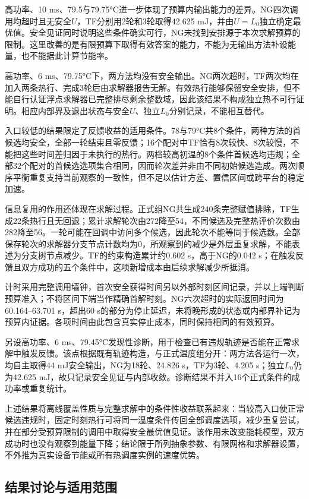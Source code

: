 高功率、10 ms、79.5与79.75°C进一步体现了预算内输出能力的差异。NG四次调用均超时且无安全$U$，TF分别用2轮和3轮取得42.625 mJ，并由$U=L_0$独立确定最优值。安全见证同时说明这些条件确实可行，NG未找到安排源于本次求解预算的限制。这里改善的是有限预算下取得有效答案的能力，不能为无输出方法补设能量，也不能据此计算节能率。

高功率、6 ms、79.75°C下，两方法均没有安全输出。NG两次超时，TF两次均在加入两条热行、完成3轮后由求解器报告无解。有效热行能够保留安全安排，但不能自行认证浮点求解器已完整排尽剩余整数域，因此该结果不构成独立热不可行证明。相应内部界及退出状态与安全$U$、独立$L_0$分别记录，不能相互替代。

入口较低的结果限定了反馈收益的适用条件。78与79°C共8个条件，两种方法的首候选均安全，全部一轮结束且零反馈；16个配对中TF恰有8次较快、8次较慢，不能把这些时间差归因于未执行的热行。两档较高初温的8个条件首候选均违规；全部32个配对的首候选选项集合相同，因而轮次差并非由不同初始候选造成。两次顺序平衡重复支持当前观察的一致性，但不足以估计方差、置信区间或跨平台的稳定加速。

信息复用的作用还体现在求解过程。正式组NG共生成240条完整赋值排除，TF生成22条热行且无回退；累计求解轮次由272降至54，不同候选及完整热评价次数由282降至56。一轮可能在回调中访问多个候选，因此轮次不能等同于候选数。全部保存轮次的求解器分支节点计数均为0，所观察到的减少是外层重复求解，不能表述为分支树节点减少。TF的约束构造累计约0.602 s，高于NG的0.042 s；在触发反馈且双方成功的五个条件中，这项新增成本由后续求解减少所抵消。

计时采用完整调用墙钟，首次安全获得时间另以外部时刻区间记录，并以上端判断预算准入；不将区间下端当作精确首解时刻。NG六次超时的实际返回时间为60.164--63.701 s，超出60 s的部分为停止延迟，未将晚形成的状态或内部界补记为预算内证据。各项时间由此包含真实停止成本，同时保持相同的有效预算。

另设高功率、6 ms、79.45°C发现性诊断，用于检查已有违规轨迹是否能在正常求解中触发反馈。该点根据既有轨迹构造，与正式温度组分开：两方法各运行一次，均自主取得44 mJ安全输出，NG为18轮、24.826 s，TF为3轮、4.205 s；独立$L_0$仍为42.625 mJ，故只记录安全见证与内部收敛。诊断结果不并入16个正式条件的成功率或重复统计。

上述结果将离线覆盖性质与完整求解中的条件性收益联系起来：当较高入口使正常候选违规时，固定时刻热行可将同一温度条件传回全部调度选项，减少重复尝试，并在部分受预算限制的调用中取得安全最优值见证。该作用未改变能耗模型，双方成功时也没有观察到能量下降；结论限于所列抽象参数、有限网格和求解器设置，不外推为真实设备节能或所有热调度实例的速度优势。


\subsection{结果讨论与适用范围}

